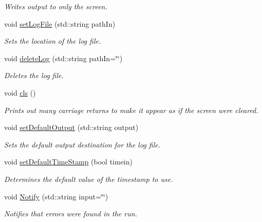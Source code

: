 \begin{DoxyCompactItemize}
\begin{DoxyCompactList}\small\item\em Writes output to only the screen. \end{DoxyCompactList}\item 
void \hyperlink{classosea_1_1ofreq_1_1_log_a6188953224e6abd070881c145a62b2ca}{set\-Log\-File} (std\-::string path\-In)
\begin{DoxyCompactList}\small\item\em Sets the location of the log file. \end{DoxyCompactList}\item 
void \hyperlink{classosea_1_1ofreq_1_1_log_a95530d8058c85ce321dd65e7e1157345}{delete\-Log} (std\-::string path\-In=\char`\"{}\char`\"{})
\begin{DoxyCompactList}\small\item\em Deletes the log file. \end{DoxyCompactList}\item 
void \hyperlink{classosea_1_1ofreq_1_1_log_a3c682950caf0eae674517c3001080fd6}{cls} ()
\begin{DoxyCompactList}\small\item\em Prints out many carriage returns to make it appear as if the screen were cleared. \end{DoxyCompactList}\item 
void \hyperlink{classosea_1_1ofreq_1_1_log_ab9b2e0aaf8e9ea9541d8353952efc9e4}{set\-Default\-Output} (std\-::string output)
\begin{DoxyCompactList}\small\item\em Sets the default output destination for the log file. \end{DoxyCompactList}\item 
void \hyperlink{classosea_1_1ofreq_1_1_log_a0254e4603561ac0d83df53afa290d4b2}{set\-Default\-Time\-Stamp} (bool timein)
\begin{DoxyCompactList}\small\item\em Determines the default value of the timestamp to use. \end{DoxyCompactList}\item 
void \hyperlink{classosea_1_1ofreq_1_1_log_a92e010cb4dd557a49099d61082175524}{Notify} (std\-::string input=\char`\"{}\char`\"{})
\begin{DoxyCompactList}\small\item\em Notifies that errors were found in the run. \end{DoxyCompactList}\end{DoxyCompactItemize}
